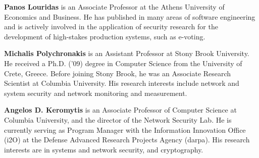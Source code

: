 \documentclass[10pt,journal,compsoc]{IEEEtran}
\begin{document}
\noindent
{\bf Panos Louridas} is an Associate Professor at
the Athens University of Economics and Business.
He has published in many areas of software engineering
and is actively involved in the application of security
research for the development of high-stakes production
systems, such as e-voting.

\noindent
{\bf Michalis Polychronakis} is an Assistant Professor
at Stony Brook University.
He received a Ph.D. ('09)
degree in Computer Science from the University of Crete, Greece.
Before joining Stony Brook, he was an Associate Research
Scientist at Columbia University.
His research interests include
network and system security and network monitoring and measurement.

\noindent
{\bf Angelos D. Keromytis} is an Associate Professor
of Computer Science at Columbia University,
and the director of the Network Security Lab.
He is currently serving as  Program Manager with the
Information Innovation Office ({\sc i}2O) at the Defense Advanced
Research Projects Agency ({\sc darpa}).
His research interests are in systems
and network security,
and cryptography.
\end{document}
